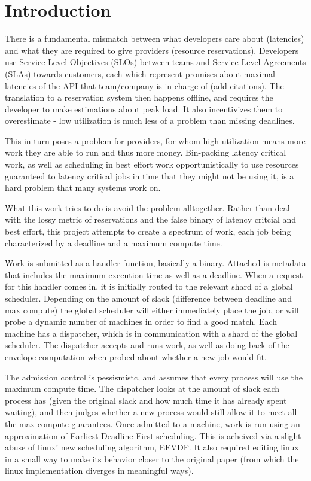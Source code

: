 \section{Introduction}


There is a fundamental mismatch between what developers care about (latencies)
and what they are required to give providers (resource reservations). Developers
use Service Level Objectives (SLOs) between teams and Service Level Agreements
(SLAs) towards customers, each which represent promises about maximal latencies
of the API that team/company is in charge of (add citations). The translation to
a reservation system then happens offline, and requires the developer to make
estimations about peak load.  It also incentivizes them to overestimate - low
utilization is much less of a problem than missing deadlines. 

This in turn poses a problem for providers, for whom high utilization means more
work they are able to run and thus more money. Bin-packing latency critical
work, as well as scheduling in best effort work opportunistically to use
resources guaranteed to latency critical jobs in time that they might not be
using it, is a hard problem that many systems work on.

What this work tries to do is avoid the problem alltogether. Rather than deal
with the lossy metric of reservations and the false binary of latency critcial
and best effort, this project attempts to create a spectrum of work, each job
being characterized by a deadline and a maximum compute time.

Work is submitted as a handler function, basically a binary. Attached is
metadata that includes the maximum execution time as well as a deadline. When a
request for this handler comes in, it is initially routed to the relevant shard
of a global scheduler. Depending on the amount of slack (difference between
deadline and max compute) the global scheduler will either immediately place the
job, or will probe a dynamic number of machines in order to find a good match.
Each machine has a dispatcher, which is in communication with a shard of the
global scheduler. The dispatcher accepts and runs work, as well as doing
back-of-the-envelope computation when probed about whether a new job would fit. 

The admission control is pessismistc, and assumes that every process will use
the maximum compute time. The dispatcher looks at the amount of slack each
process has (given the original slack and how much time it has already spent
waiting), and then judges whether a new process would still allow it to meet all
the max compute guarantees. Once admitted to a machine, work is run using an
approximation of Earliest Deadline First scheduling. This is acheived via a
slight abuse of linux' new scheduling algorithm, EEVDF. It also required editing
linux in a small way to make its behavior closer to the original paper (from
which the linux implementation diverges in meaningful ways). 

